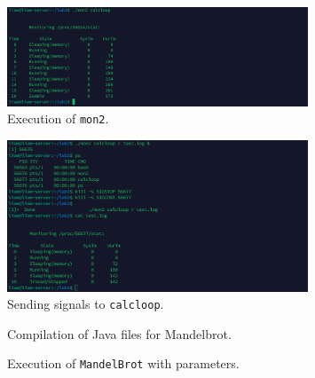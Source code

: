 \documentclass[a4paper,12pt]{article}
\begin{document}
\begin{figure}[h]
    \centering
    \includegraphics[width=0.8\textwidth]{./mon2_output.png}
    \caption{Execution of \texttt{mon2}.}
\end{figure}

\begin{figure}[h]
    \centering
    \includegraphics[width=0.8\textwidth]{./mon2_signals.png}
    \caption{Sending signals to \texttt{calcloop}.}
\end{figure}

\begin{figure}[h]
    \centering
    \caption{Compilation of Java files for Mandelbrot.}
\end{figure}

\begin{figure}[h]
    \centering
    \caption{Execution of \texttt{MandelBrot} with parameters.}
\end{figure}
\end{document}
